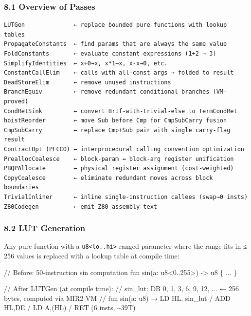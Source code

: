 \documentclass[
  11pt,
  a4paper,
]{report}
\newenvironment{Shaded}{\begin{snugshade}\small}{\end{snugshade}}
\newcommand{\NormalTok}[1]{#1}
\begin{document}
\subsubsection{8.1 Overview of Passes}\label{overview-of-passes}

\begin{verbatim}
LUTGen              ← replace bounded pure functions with lookup tables
PropagateConstants  ← find params that are always the same value
FoldConstants       ← evaluate constant expressions (1+2 → 3)
SimplifyIdentities  ← x+0→x, x*1→x, x-x→0, etc.
ConstantCallElim    ← calls with all-const args → folded to result
DeadStoreElim       ← remove unused instructions
BranchEquiv         ← remove redundant conditional branches (VM-proved)
CondRetSink         ← convert BrIf-with-trivial-else to TermCondRet
hoistReorder        ← move Sub before Cmp for CmpSubCarry fusion
CmpSubCarry         ← replace Cmp+Sub pair with single carry-flag result
ContractOpt (PFCCO) ← interprocedural calling convention optimization
PreallocCoalesce    ← block-param ↔ block-arg register unification
PBQPAllocate        ← physical register assignment (cost-weighted)
CopyCoalesce        ← eliminate redundant moves across block boundaries
TrivialInliner      ← inline single-instruction callees (swap→0 insts)
Z80Codegen          ← emit Z80 assembly text
\end{verbatim}

\subsubsection{8.2 LUT Generation}\label{lut-generation}

Any pure function with a \texttt{u8\textless{}lo..hi\textgreater{}}
ranged parameter where the range fits in ≤ 256 values is replaced with a
lookup table at compile time:

\begin{Shaded}
\begin{Highlighting}[]
\NormalTok{// Before: 50{-}instruction sin computation}
\NormalTok{fun sin(a: u8\textless{}0..255\textgreater{}) {-}\textgreater{} u8 \{ ... \}}

\NormalTok{// After LUTGen (at compile time):}
\NormalTok{// sin\_lut: DB 0, 1, 3, 6, 9, 12, ...  ← 256 bytes, computed via MIR2 VM}
\NormalTok{// fun sin(a: u8) → LD HL, sin\_lut / ADD HL,DE / LD A,(HL) / RET  (6 insts, \textasciitilde{}39T)}
\end{Highlighting}
\end{Shaded}
\end{document}
